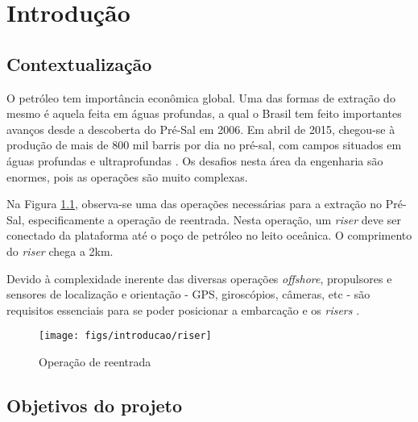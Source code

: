  


\chapter{Introdução}

\label{CapIntro}



\section{Contextualização}

O petróleo tem importância econômica global. Uma das formas de extração do mesmo é aquela feita em águas profundas, a qual o Brasil tem feito importantes avanços desde a descoberta do Pré-Sal em 2006. Em abril de 2015, chegou-se à produção de mais de 800 mil barris por dia no pré-sal, com campos situados em águas profundas e ultraprofundas \cite{preSal}. Os desafios nesta área da engenharia são enormes, pois as operações são muito complexas.

Na Figura \ref{riser}, observa-se uma das operações necessárias para a extração no Pré-Sal, especificamente a operação de reentrada. Nesta operação, um \textit{riser} deve ser conectado da plataforma até o poço de petróleo no leito oceânica. O comprimento do \textit{riser} chega a 2km.

Devido à complexidade inerente das diversas operações \textit{offshore}, propulsores e sensores de localização e orientação - GPS, giroscópios, câmeras, etc - são requisitos essenciais para se poder posicionar a embarcação e os \textit{risers} \cite{redytton}.

\begin{figure}[ht!]
\centering
  \texttt{[image: figs/introducao/riser]}
  \caption{Operação de reentrada \cite{eugenioASME2012}\label{riser}}
\end{figure}


\section{Objetivos do projeto}

